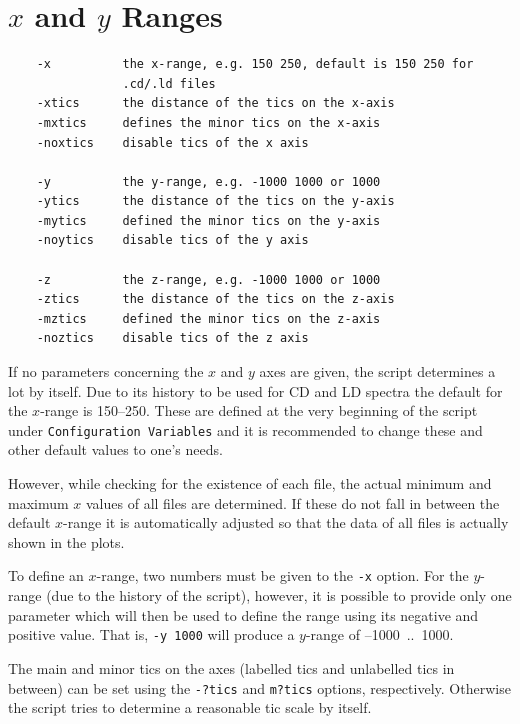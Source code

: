 \documentclass[12pt, a4paper]{article}
\begin{document}


\section{$x$ and $y$ Ranges}

\begin{verbatim}
    -x          the x-range, e.g. 150 250, default is 150 250 for
                .cd/.ld files
    -xtics      the distance of the tics on the x-axis
    -mxtics     defines the minor tics on the x-axis
    -noxtics    disable tics of the x axis

    -y          the y-range, e.g. -1000 1000 or 1000
    -ytics      the distance of the tics on the y-axis
    -mytics     defined the minor tics on the y-axis
    -noytics    disable tics of the y axis

    -z          the z-range, e.g. -1000 1000 or 1000
    -ztics      the distance of the tics on the z-axis
    -mztics     defined the minor tics on the z-axis
    -noztics    disable tics of the z axis
\end{verbatim}

If no parameters concerning the $x$ and $y$ axes are given, the script determines a lot by itself. Due to its history to be used for CD and LD spectra the default for the $x$-range is 150--250. These are defined at the very beginning of the script under \texttt{Configuration Variables} and it is recommended to change these and other default values to one's needs.

However, while checking for the existence of each file, the actual minimum and maximum $x$ values of all files are determined. If these do not fall in between the default $x$-range it is automatically adjusted so that the data of all files is actually shown in the plots.

To define an $x$-range, two numbers must be given to the \verb'-x' option. For the $y$-range (due to the history of the script), however, it is possible to provide only one parameter which will then be used to define the range using its negative and positive value. That is, \verb'-y 1000' will produce a $y$-range of --1000~..~1000.

The main and minor tics on the axes (labelled tics and unlabelled tics in between) can be set using the \verb'-?tics' and \verb'm?tics' options, respectively. Otherwise the script tries to determine a reasonable tic scale by itself.
\end{document}
